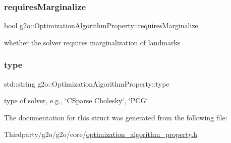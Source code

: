 \subsubsection{\texorpdfstring{requires\+Marginalize}{requiresMarginalize}}
{\footnotesize\ttfamily bool g2o\+::\+Optimization\+Algorithm\+Property\+::requires\+Marginalize}



whether the solver requires marginalization of landmarks 

\mbox{\label{structg2o_1_1_optimization_algorithm_property_a199f33f536f48f6ceda037f6a2ff206d}} 
\subsubsection{\texorpdfstring{type}{type}}
{\footnotesize\ttfamily std\+::string g2o\+::\+Optimization\+Algorithm\+Property\+::type}



type of solver, e.\+g., \char`\"{}\+C\+Sparse Cholesky\char`\"{}, \char`\"{}\+P\+C\+G\char`\"{} 



The documentation for this struct was generated from the following file\+:\begin{DoxyCompactItemize}
\item 
Thirdparty/g2o/g2o/core/\mbox{\hyperlink{optimization__algorithm__property_8h}{optimization\+\_\+algorithm\+\_\+property.\+h}}\end{DoxyCompactItemize}
